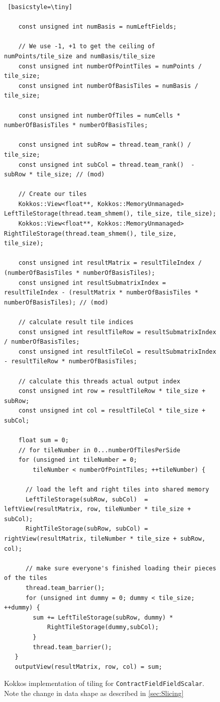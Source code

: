 \begin{figure}[H]
    \begin{lstlisting} [basicstyle=\tiny]
    
    const unsigned int numBasis = numLeftFields;

    // We use -1, +1 to get the ceiling of numPoints/tile_size and numBasis/tile_size
    const unsigned int numberOfPointTiles = numPoints / tile_size;
    const unsigned int numberOfBasisTiles = numBasis / tile_size;

    const unsigned int numberOfTiles = numCells * numberOfBasisTiles * numberOfBasisTiles;

    const unsigned int subRow = thread.team_rank() / tile_size;
    const unsigned int subCol = thread.team_rank()  - subRow * tile_size; // (mod)

    // Create our tiles
    Kokkos::View<float**, Kokkos::MemoryUnmanaged> LeftTileStorage(thread.team_shmem(), tile_size, tile_size);
    Kokkos::View<float**, Kokkos::MemoryUnmanaged> RightTileStorage(thread.team_shmem(), tile_size, tile_size);

    const unsigned int resultMatrix = resultTileIndex / (numberOfBasisTiles * numberOfBasisTiles);
    const unsigned int resultSubmatrixIndex = resultTileIndex - (resultMatrix * numberOfBasisTiles * numberOfBasisTiles); // (mod)

    // calculate result tile indices
    const unsigned int resultTileRow = resultSubmatrixIndex / numberOfBasisTiles;
    const unsigned int resultTileCol = resultSubmatrixIndex  - resultTileRow * numberOfBasisTiles;

    // calculate this threads actual output index
    const unsigned int row = resultTileRow * tile_size + subRow;
    const unsigned int col = resultTileCol * tile_size + subCol;

    float sum = 0;
    // for tileNumber in 0...numberOfTilesPerSide
    for (unsigned int tileNumber = 0;
        tileNumber < numberOfPointTiles; ++tileNumber) {

      // load the left and right tiles into shared memory
      LeftTileStorage(subRow, subCol)  = leftView(resultMatrix, row, tileNumber * tile_size + subCol);
      RightTileStorage(subRow, subCol) = rightView(resultMatrix, tileNumber * tile_size + subRow, col);
      
      // make sure everyone's finished loading their pieces of the tiles
      thread.team_barrier();
      for (unsigned int dummy = 0; dummy < tile_size; ++dummy) {
        sum += LeftTileStorage(subRow, dummy) *
            RightTileStorage(dummy,subCol);
        }
        thread.team_barrier();
   }
   outputView(resultMatrix, row, col) = sum;
 \end{lstlisting}
 \caption[\texttt{ContractFieldFieldScalar} tiling implementation]{Kokkos
     implementation of tiling for \texttt{ContractFieldFieldScalar}. Note the change 
     in data shape as described in \ref{sec:Slicing}}
 \label{lst:ContractFieldFieldScalarTilingCode}
\end{figure}


